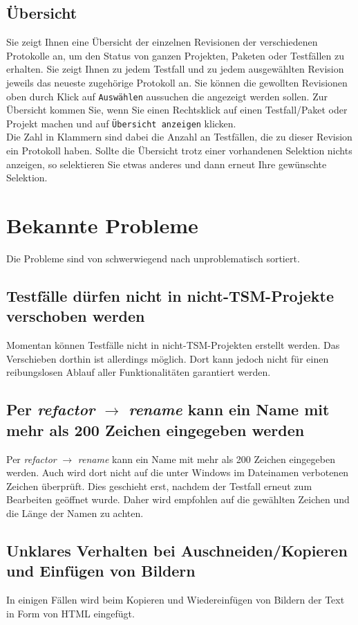 \documentclass[11pt,a4paper,titlepage]{article}
\begin{document}
\subsection{Übersicht}
Sie zeigt Ihnen eine Übersicht der einzelnen Revisionen der verschiedenen Protokolle an, um den Status von ganzen Projekten, Paketen oder Testfällen zu erhalten.
Sie zeigt Ihnen zu jedem Testfall und zu jedem ausgewählten Revision jeweils das neueste zugehörige Protokoll an.
Sie können die gewollten Revisionen oben durch Klick auf \texttt{Auswählen} aussuchen die angezeigt werden sollen.
Zur Übersicht kommen Sie, wenn Sie einen Rechtsklick auf einen Testfall/Paket oder Projekt machen und auf \texttt{Übersicht anzeigen} klicken.\\
Die Zahl in Klammern sind dabei die Anzahl an Testfällen, die zu dieser Revision ein Protokoll haben.
Sollte die Übersicht trotz einer vorhandenen Selektion nichts anzeigen, so selektieren Sie etwas anderes und dann erneut Ihre gewünschte Selektion.


\section{Bekannte Probleme}
Die Probleme sind von schwerwiegend nach unproblematisch sortiert.\\

\subsection*{Testfälle dürfen nicht in nicht-TSM-Projekte verschoben werden}
Momentan können Testfälle nicht in nicht-TSM-Projekten erstellt werden. Das Verschieben dorthin ist allerdings möglich.
Dort kann jedoch nicht für einen reibungslosen Ablauf aller Funktionalitäten garantiert werden.

\subsection*{Per \textit{refactor} $ \rightarrow $ \textit{rename} kann ein Name mit mehr als 200 Zeichen eingegeben werden}
Per \textit{refactor} $ \rightarrow $ \textit{rename} kann ein Name mit mehr als 200 Zeichen eingegeben werden. 
Auch wird dort nicht auf die unter Windows im Dateinamen verbotenen Zeichen überprüft.
Dies geschieht erst, nachdem der Testfall erneut zum Bearbeiten geöffnet wurde. Daher wird empfohlen auf die gewählten Zeichen und die Länge der Namen zu achten.

\subsection*{Unklares Verhalten bei Auschneiden/Kopieren und Einfügen von Bildern}
In einigen Fällen wird beim Kopieren und Wiedereinfügen von Bildern der Text in Form von HTML eingefügt.
\end{document}
